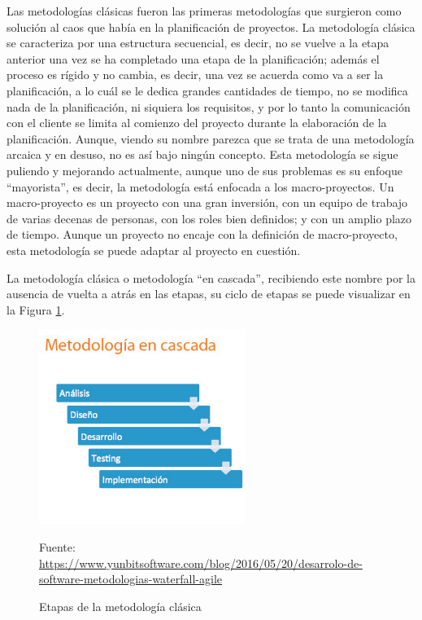 Las metodologías clásicas fueron las primeras metodologías que surgieron como solución al caos que había en la planificación de proyectos. La metodología clásica se caracteriza por una estructura secuencial, es decir, no se vuelve a la etapa anterior una vez se ha completado una etapa de la planificación; además el proceso es rígido y no cambia, es decir, una vez se acuerda como va a ser la planificación, a lo cuál se le dedica grandes cantidades de tiempo, no se modifica nada de la planificación, ni siquiera los requisitos, y por lo tanto la comunicación con el cliente se limita al comienzo del proyecto durante la elaboración de la planificación. Aunque, viendo su nombre parezca que se trata de una metodología arcaica y en desuso, no es así bajo ningún concepto. Esta metodología se sigue puliendo y mejorando actualmente, aunque uno de sus problemas es su enfoque ``mayorista'', es decir, la metodología está enfocada a los macro-proyectos. Un macro-proyecto es un proyecto con una gran inversión, con un equipo de trabajo de varias decenas de personas, con los roles bien definidos; y con un amplio plazo de tiempo. Aunque un proyecto no encaje con la definición de macro-proyecto, esta metodología se puede adaptar al proyecto en cuestión.

La metodología clásica o metodología ``en cascada'', recibiendo este nombre por la ausencia de vuelta a atrás en las etapas, su ciclo de etapas se puede visualizar en la Figura \ref{fig:etapas_clasica}.

\begin{figure}[h]
    \centering
    \includegraphics[width=0.6\textwidth]{imagenes/03_Analisis/meto_clasica.jpg}
    \label{fig:etapas_clasica}
    \begin{center}
        Fuente: \url{https://www.yunbitsoftware.com/blog/2016/05/20/desarrolo-de-software-metodologias-waterfall-agile}
    \end{center}
    \caption{Etapas de la metodología clásica}
\end{figure}


